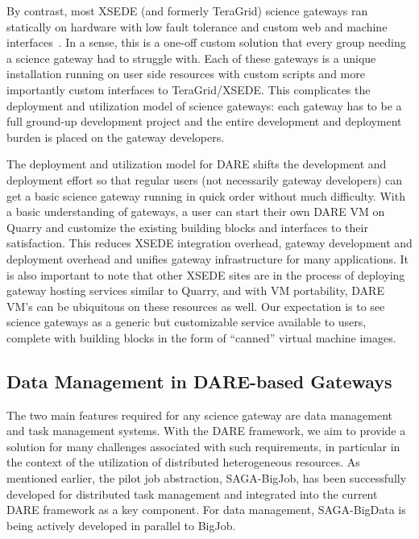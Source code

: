 \documentclass[]{svjour3}
\begin{document}
By contrast, most XSEDE (and formerly TeraGrid) science gateways ran
statically on hardware with low fault tolerance and custom web and
machine interfaces~\cite{xsedegateways}. In a
sense, this is a one-off custom solution that every group needing a
science gateway had to struggle with. Each of these gateways is a
unique installation running on user side resources with custom scripts
and more importantly custom interfaces to TeraGrid/XSEDE. This
complicates the deployment and utilization model of science gateways:
each gateway has to be a full ground-up development project and the
entire development and deployment burden is placed on the gateway
developers.

The deployment and utilization model for DARE shifts the development
and deployment effort so that regular users (not necessarily gateway
developers) can get a basic science gateway running in quick order
without much difficulty. With a basic understanding of gateways, a
user can start their own DARE VM on Quarry and customize the existing
building blocks and interfaces to their satisfaction. This reduces
XSEDE integration overhead, gateway development and deployment
overhead and unifies gateway infrastructure for many applications. It
is also important to note that other XSEDE sites are in the process of
deploying gateway hosting services similar to Quarry, and with VM
portability, DARE VM's can be ubiquitous on these resources as
well. Our expectation is to see science gateways as a generic but
customizable service available to users, complete with building blocks
in the form of ``canned'' virtual machine images.


\subsection{Data Management in DARE-based Gateways}

The two main features required for any science gateway are data
management and task management systems. With the DARE framework, we
aim to provide a solution for many challenges associated with such
requirements, in particular in the context of the utilization of
distributed heterogeneous resources. As mentioned earlier, the pilot
job abstraction, SAGA-BigJob, has been successfully developed for
distributed task management and integrated into the current DARE
framework as a key component. For data management, SAGA-BigData is
being actively developed in parallel to BigJob.
\end{document}
